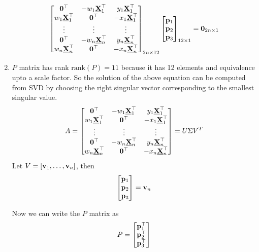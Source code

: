 \documentclass{article}
\begin{document}
\begin{enumerate}
       \[
         \begin{bmatrix}
           \mathbf{0}^\top & -w_1 \underline{\mathbf{X}}_1^\top & y_1 \underline{\mathbf{X}}_1^\top \\
           w_1 \underline{\mathbf{X}}_1^\top & \mathbf{0}^\top  & -x_1 \underline{\mathbf{X}}_1^\top \\
           \vdots & \vdots & \vdots\\
           \mathbf{0}^\top & -w_n \underline{\mathbf{X}}_n^\top & y_n \underline{\mathbf{X}}_n^\top \\
           w_n \underline{\mathbf{X}}_n^\top & \mathbf{0}^\top  & -x_n \underline{\mathbf{X}}_n^\top \\
         \end{bmatrix}_{2n \times 12}
         \begin{bmatrix}
           \mathbf{p}_1 \\
           \mathbf{p}_2 \\
           \mathbf{p}_3
         \end{bmatrix}_{12 \times 1}
         = \mathbf{0}_{2n \times 1}
       \]
   \item $P$ matrix has rank $\text{rank}(P) = 11$ because it has 12 elements
     and equivalence upto a scale factor. So the solution of the above equation
     can be computed from SVD by choosing the right singular vector corresponding
     to the smallest singular value.
     \[
      A = \begin{bmatrix}
        \mathbf{0}^\top & -w_1 \underline{\mathbf{X}}_1^\top & y_1 \underline{\mathbf{X}}_1^\top \\
        w_1 \underline{\mathbf{X}}_1^\top & \mathbf{0}^\top  & -x_1 \underline{\mathbf{X}}_1^\top \\
        \vdots & \vdots & \vdots\\
        \mathbf{0}^\top & -w_n \underline{\mathbf{X}}_n^\top & y_n \underline{\mathbf{X}}_n^\top \\
        w_n \underline{\mathbf{X}}_n^\top & \mathbf{0}^\top  & -x_n \underline{\mathbf{X}}_n^\top \\
       \end{bmatrix} = U\Sigma V^T
     \]
     Let $V = [\mathbf{v}_1, \dots, \mathbf{v}_n]$, then
     \[
       \begin{bmatrix}
         \mathbf{p}_1 \\
         \mathbf{p}_2 \\
         \mathbf{p}_3
         \end{bmatrix} = \mathbf{v}_n
       \]

       Now we can write the $P$ matrix as
       \[
         P = \begin{bmatrix}
           \mathbf{p}_1^\top \\
           \mathbf{p}_2^\top \\
           \mathbf{p}_3^\top
         \end{bmatrix}
         \]
\end{enumerate}
\newpage
\end{document}
